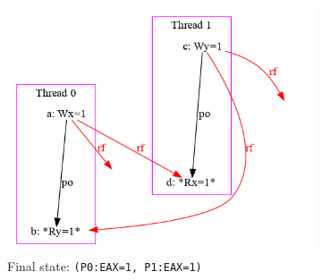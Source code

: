 \begin{figure}[!htb]
\centering
\begin{subfigure}[t]{.28\textwidth}
  \centering
  \includegraphics[width=1.2\linewidth]{img/my/sb-example/SB-dot.png}
  \caption{Final state: \texttt{(P0:EAX=1,~P1:EAX=1)}}
  \label{simple_wmm_x86_pic:sub1}
\end{subfigure}
\hfill
\begin{subfigure}[t]{.23\textwidth}
  \centering

\end{subfigure}
\end{figure}
